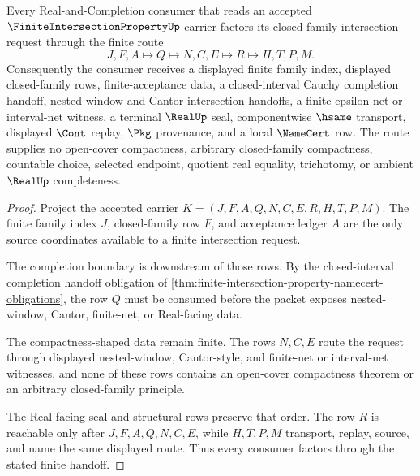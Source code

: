 \begin{theorem}
\label{thm:closed-interval-cauchy-completion-finite-intersection-property}
Every Real-and-Completion consumer that reads an accepted $\FiniteIntersectionPropertyUp$ carrier factors its closed-family intersection request through the finite route
$$
J,F,A \longmapsto Q \longmapsto N,C,E \longmapsto R \longmapsto H,T,P,M .
$$
Consequently the consumer receives a displayed finite family index, displayed closed-family rows, finite-acceptance data, a closed-interval Cauchy completion handoff, nested-window and Cantor intersection handoffs, a finite epsilon-net or interval-net witness, a terminal $\RealUp$ seal, componentwise $\hsame$ transport, displayed $\Cont$ replay, $\Pkg$ provenance, and a local $\NameCert$ row. The route supplies no open-cover compactness, arbitrary closed-family compactness, countable choice, selected endpoint, quotient real equality, trichotomy, or ambient $\RealUp$ completeness.
\end{theorem}
\begin{proof}
Project the accepted carrier $K=(J,F,A,Q,N,C,E,R,H,T,P,M)$. The finite family index $J$, closed-family row $F$, and acceptance ledger $A$ are the only source coordinates available to a finite intersection request.

The completion boundary is downstream of those rows. By the closed-interval completion handoff obligation of \autoref{thm:finite-intersection-property-namecert-obligations}, the row $Q$ must be consumed before the packet exposes nested-window, Cantor, finite-net, or Real-facing data.

The compactness-shaped data remain finite. The rows $N,C,E$ route the request through displayed nested-window, Cantor-style, and finite-net or interval-net witnesses, and none of these rows contains an open-cover compactness theorem or an arbitrary closed-family principle.

The Real-facing seal and structural rows preserve that order. The row $R$ is reachable only after $J,F,A,Q,N,C,E$, while $H,T,P,M$ transport, replay, source, and name the same displayed route. Thus every consumer factors through the stated finite handoff.
\end{proof}

